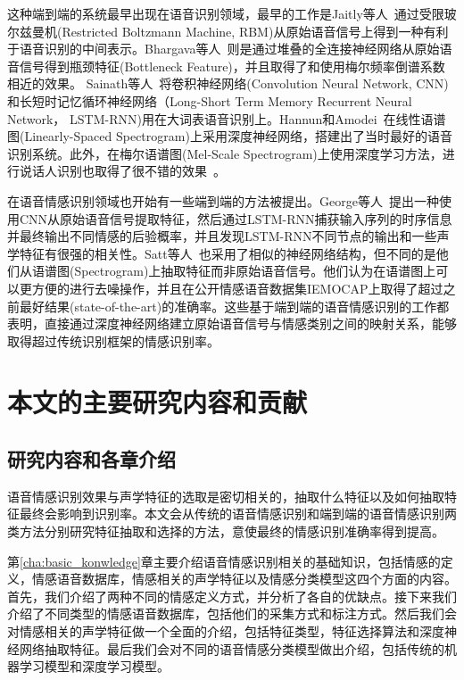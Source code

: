 这种端到端的系统最早出现在语音识别领域，最早的工作是Jaitly等人~\cite{Jaitly2011Learning}通过受限玻尔兹曼机(Restricted Boltzmann Machine, RBM)从原始语音信号上得到一种有利于语音识别的中间表示。Bhargava等人~\cite{Bhargava2015Architectures}则是通过堆叠的全连接神经网络从原始语音信号得到瓶颈特征(Bottleneck Feature)，并且取得了和使用梅尔频率倒谱系数相近的效果。 Sainath等人~\cite{Sainath2015Convolutional}将卷积神经网络(Convolution Neural Network, CNN)和长短时记忆循环神经网络（Long-Short Term Memory Recurrent Neural Network， LSTM-RNN)用在大词表语音识别上。Hannun和Amodei~\cite{Amodei2015Deep}在线性语谱图(Linearly-Spaced Spectrogram)上采用深度神经网络，搭建出了当时最好的语音识别系统。此外，在梅尔语谱图(Mel-Scale Spectrogram)上使用深度学习方法，进行说话人识别也取得了很不错的效果~\cite{Variani2014Deep}。

在语音情感识别领域也开始有一些端到端的方法被提出。George等人~\cite{Trigeorgis2016Adieu}提出一种使用CNN从原始语音信号提取特征，然后通过LSTM-RNN捕获输入序列的时序信息并最终输出不同情感的后验概率，并且发现LSTM-RNN不同节点的输出和一些声学特征有很强的相关性。Satt等人~\cite{Satt2017Efficient}也采用了相似的神经网络结构，但不同的是他们从语谱图(Spectrogram)上抽取特征而非原始语音信号。他们认为在语谱图上可以更方便的进行去噪操作，并且在公开情感语音数据集IEMOCAP上取得了超过之前最好结果(state-of-the-art)的准确率。这些基于端到端的语音情感识别的工作都表明，直接通过深度神经网络建立原始语音信号与情感类别之间的映射关系，能够取得超过传统识别框架的情感识别率。

\section{本文的主要研究内容和贡献}
\label{sec:content_contribution}

\subsection{研究内容和各章介绍}
\label{ssec:content}
语音情感识别效果与声学特征的选取是密切相关的，抽取什么特征以及如何抽取特征最终会影响到识别率。本文会从传统的语音情感识别和端到端的语音情感识别两类方法分别研究特征抽取和选择的方法，意使最终的情感识别准确率得到提高。

 第\ref{cha:basic_konwledge}章主要介绍语音情感识别相关的基础知识，包括情感的定义，情感语音数据库，情感相关的声学特征以及情感分类模型这四个方面的内容。首先，我们介绍了两种不同的情感定义方式，并分析了各自的优缺点。接下来我们介绍了不同类型的情感语音数据库，包括他们的采集方式和标注方式。然后我们会对情感相关的声学特征做一个全面的介绍，包括特征类型，特征选择算法和深度神经网络抽取特征。最后我们会对不同的语音情感分类模型做出介绍，包括传统的机器学习模型和深度学习模型。

